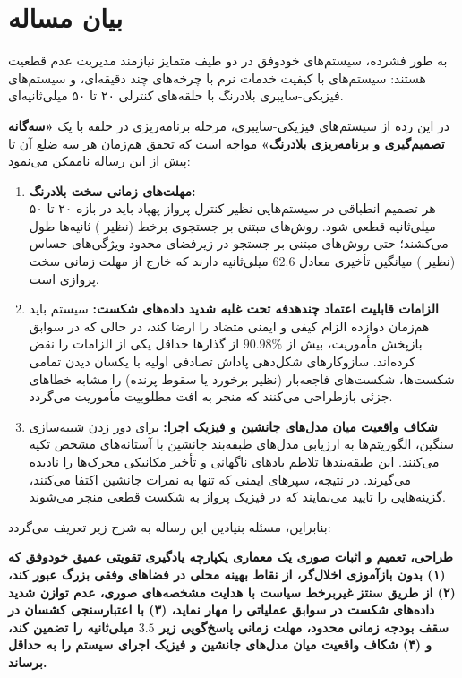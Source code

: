 \documentclass[oneside,openany,phd]{TMU-Thesis}
\begin{document}
\section{بیان مساله}

به طور فشرده، سیستم‌های خودوفق در دو طیف متمایز نیازمند مدیریت عدم قطعیت هستند: سیستم‌های با کیفیت خدمات نرم با چرخه‌های چند دقیقه‌ای، و سیستم‌های فیزیکی-سایبری بلادرنگ با حلقه‌های کنترلی ۲۰ تا ۵۰ میلی‌ثانیه‌ای.

در این رده از سیستم‌های فیزیکی-سایبری، مرحله برنامه‌ریزی در حلقه  با یک \textbf{«سه‌گانه تصمیم‌گیری و برنامه‌ریزی بلادرنگ»} مواجه است که تحقق هم‌زمان هر سه ضلع آن تا پیش از این رساله ناممکن می‌نمود:
\begin{enumerate}
    \item \textbf{مهلت‌های زمانی سخت بلادرنگ:} \\
    هر تصمیم انطباقی در سیستم‌هایی نظیر کنترل پرواز پهپاد باید در بازه ۲۰ تا ۵۰ میلی‌ثانیه قطعی شود. روش‌های مبتنی بر جستجوی برخط (نظیر ) ثانیه‌ها طول می‌کشند؛ حتی روش‌های مبتنی بر جستجو در زیرفضای محدود ویژگی‌های حساس (نظیر ) میانگین تأخیری معادل $62.6$ میلی‌ثانیه دارند که خارج از مهلت زمانی سخت پروازی است.
    \item \textbf{الزامات قابلیت اعتماد چندهدفه تحت غلبه شدید داده‌های شکست:} سیستم باید هم‌زمان دوازده الزام کیفی و ایمنی متضاد را ارضا کند، در حالی که در سوابق بازپخش مأموریت، بیش از $90.98\%$ از گذارها حداقل یکی از الزامات را نقض کرده‌اند. سازوکارهای شکل‌دهی پاداش تصادفی اولیه با یکسان دیدن تمامی شکست‌ها، شکست‌های فاجعه‌بار (نظیر برخورد یا سقوط پرنده) را مشابه خطاهای جزئی بازطراحی می‌کنند که منجر به افت مطلوبیت مأموریت می‌گردد.
    \item \textbf{شکاف واقعیت میان مدل‌های جانشین و فیزیک اجرا:} برای دور زدن شبیه‌سازی سنگین، الگوریتم‌ها به ارزیابی مدل‌های طبقه‌بند جانشین با آستانه‌های مشخص تکیه می‌کنند. این طبقه‌بندها تلاطم بادهای ناگهانی و تأخیر مکانیکی محرک‌ها را نادیده می‌گیرند. در نتیجه، سپرهای ایمنی که تنها به نمرات جانشین اکتفا می‌کنند، گزینه‌هایی را تایید می‌نمایند که در فیزیک پرواز به شکست قطعی منجر می‌شوند.
\end{enumerate}

بنابراین، مسئله بنیادین این رساله به شرح زیر تعریف می‌گردد:
\begin{center}
\textbf{طراحی، تعمیم و اثبات صوری یک معماری یکپارچه یادگیری تقویتی عمیق خودوفق که (۱) بدون بازآموزی اخلال‌گر، از نقاط بهینه محلی در فضاهای وفقی بزرگ عبور کند، (۲) از طریق سنتز غیربرخط سیاست با هدایت مشخصه‌های صوری، عدم توازن شدید داده‌های شکست در سوابق عملیاتی را مهار نماید، (۳) با اعتبارسنجی کشسان در سقف بودجه زمانی محدود، مهلت زمانی پاسخ‌گویی زیر $3.5$ میلی‌ثانیه را تضمین کند، و (۴) شکاف واقعیت میان مدل‌های جانشین و فیزیک اجرای سیستم را به حداقل برساند.}
\end{center}
\end{document}
